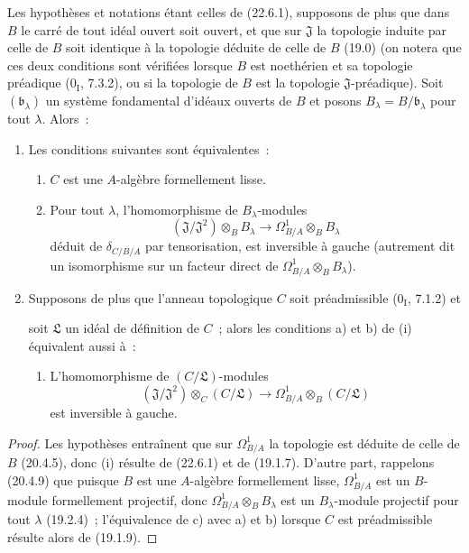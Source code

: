 \begin{corollary}[22.6.2]
\label{0.22.6.2-fr}
Les hypothèses et notations étant celles de (22.6.1), supposons de plus que
dans $B$ le carré de tout idéal ouvert soit ouvert, et que sur $\mathfrak J$ la
topologie induite par celle de $B$ soit identique à la topologie déduite de
celle de $B$ (19.0) (on notera que ces deux conditions sont vérifiées lorsque
$B$ est noethérien et sa topologie préadique ($0_{\mathrm I}$, 7.3.2), ou si la
topologie de $B$ est la topologie $\mathfrak J$-préadique). Soit
$(\mathfrak b_\lambda)$ un système fondamental d'idéaux ouverts de $B$ et
posons $B_\lambda=B/\mathfrak b_\lambda$ pour tout $\lambda$. Alors~:
\begin{enumerate}
  \item[\rm(i)] Les conditions suivantes sont équivalentes~:
  \begin{enumerate}
    \item[a)] $C$ est une $A$-algèbre formellement lisse.
    \item[b)] Pour tout $\lambda$, l'homomorphisme de $B_\lambda$-modules
    \begin{equation}
    \label{0.22.6.2.1-fr}
      (\mathfrak J/\mathfrak J^2)\otimes_BB_\lambda
      \longrightarrow\Omega^1_{B/A}\otimes_BB_\lambda
      \tag{22.6.2.1}
    \end{equation}
    déduit de $\delta_{C/B/A}$ par tensorisation, est inversible à gauche
    (autrement dit un isomorphisme sur un facteur direct de
    $\Omega^1_{B/A}\otimes_BB_\lambda$).
  \end{enumerate}
  \item[\rm(ii)] Supposons de plus que l'anneau topologique $C$ soit
  préadmissible ($0_{\mathrm I}$, 7.1.2) et


  soit $\mathfrak L$ un idéal de définition de $C$~; alors les conditions a)
  et b) de (i) équivalent aussi à~:
  \begin{enumerate}
    \item[c)] L'homomorphisme de $(C/\mathfrak L)$-modules
    \[
      (\mathfrak J/\mathfrak J^2)\otimes_C(C/\mathfrak L)
      \longrightarrow\Omega^1_{B/A}\otimes_B(C/\mathfrak L)
    \]
    est inversible à gauche.
  \end{enumerate}
\end{enumerate}
\end{corollary}

\begin{proof}
Les hypothèses entraînent que sur $\Omega^1_{B/A}$ la topologie est déduite de
celle de $B$ (20.4.5), donc (i) résulte de (22.6.1) et de (19.1.7). D'autre
part, rappelons (20.4.9) que puisque $B$ est une $A$-algèbre formellement
lisse, $\Omega^1_{B/A}$ est un $B$-module formellement projectif, donc
$\Omega^1_{B/A}\otimes_BB_\lambda$ est un $B_\lambda$-module projectif pour
tout $\lambda$ (19.2.4)~; l'équivalence de c) avec a) et b) lorsque $C$ est
préadmissible résulte alors de (19.1.9).
\end{proof}

